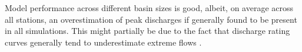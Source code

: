 Model performance across different basin sizes is good, albeit, on average across all stations, an overestimation of peak discharges if generally found to be present in all simulations.
This might partially be due to the fact that discharge rating curves generally tend to underestimate extreme flows \citep{DiBaldassarre2009}.
\afterpage{\clearpage}
